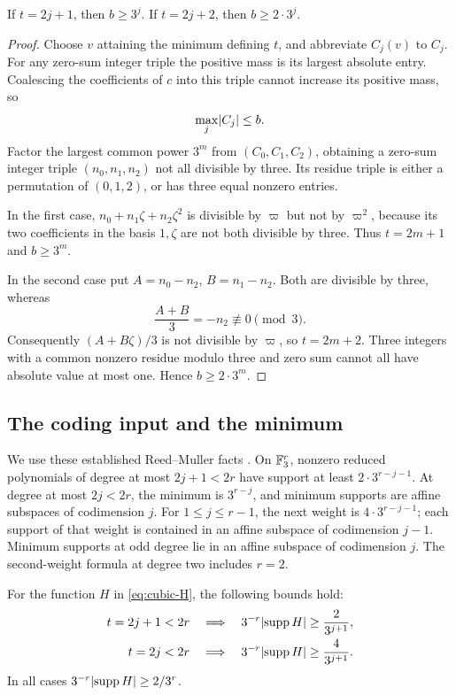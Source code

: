 \begin{lemma}
\label{lem:cubic-cost}
If $t=2j+1$, then $b\geq3^j$. If $t=2j+2$, then $b\geq2\cdot3^j$.
\end{lemma}

\begin{proof}
Choose $v$ attaining the minimum defining $t$, and abbreviate $C_j(v)$ to
$C_j$. For any zero-sum integer triple the positive mass is its largest
absolute entry. Coalescing the coefficients of $c$ into this triple
cannot increase its positive mass, so
\[
 \max_j\lvert C_j\rvert\leq b.
\]
Factor the largest common power $3^m$ from $(C_0,C_1,C_2)$, obtaining a
zero-sum integer triple $(n_0,n_1,n_2)$ not all divisible by three. Its
residue triple is either a permutation of $(0,1,2)$, or has three equal
nonzero entries.

In the first case,
$n_0+n_1\zeta+n_2\zeta^2$ is divisible by $\varpi$ but not by
$\varpi^2$, because its two coefficients in the basis $1,\zeta$ are not
both divisible by three. Thus $t=2m+1$ and
$b\geq3^m$.

In the second case put $A=n_0-n_2$, $B=n_1-n_2$. Both are divisible by
three, whereas
\[
 \frac{A+B}{3}=-n_2\not\equiv0\pmod3.
\]
Consequently $(A+B\zeta)/3$ is not divisible by $\varpi$, so $t=2m+2$.
Three integers with a common nonzero residue modulo three and zero sum
cannot all have absolute value at most one. Hence
$b\geq2\cdot3^m$.
\end{proof}

\subsection{The coding input and the minimum}

We use these established Reed--Muller facts
\cite{leducq2012,leducq2010}. On $\mathbb F_3^r$, nonzero reduced polynomials of
degree at most $2j+1<2r$ have support at least
$2\cdot3^{r-j-1}$. At degree at most $2j<2r$, the minimum is $3^{r-j}$,
and minimum supports are affine subspaces of codimension $j$. For
$1\leq j\leq r-1$, the next weight is $4\cdot3^{r-j-1}$; each support
of that weight is contained in an affine subspace of codimension $j-1$.
Minimum supports at odd degree lie in an affine subspace of codimension
$j$. The second-weight formula at degree two includes $r=2$.

\begin{lemma}
\label{lem:cubic-weight}
For the function $H$ in \eqref{eq:cubic-H}, the following bounds hold:
\begin{align}
 t=2j+1<2r&\quad\Longrightarrow\quad
  3^{-r}\lvert\operatorname{supp} H\rvert\geq\frac2{3^{j+1}},\label{eq:cubic-odd}\\
 t=2j<2r&\quad\Longrightarrow\quad
  3^{-r}\lvert\operatorname{supp} H\rvert\geq\frac4{3^{j+1}}.
  \label{eq:cubic-even}
\end{align}
In all cases $3^{-r}\lvert\operatorname{supp} H\rvert\geq2/3^r$.
\end{lemma}

